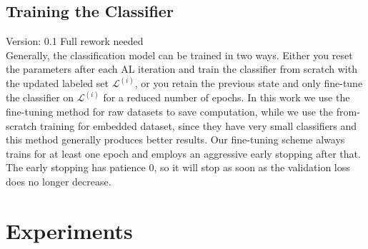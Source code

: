\documentclass[]{article}
\begin{document}
\subsection{Training the Classifier}\label{sec:training_the_classifier}
{\color{red} Version: 0.1 Full rework needed}\\
Generally, the classification model can be trained in two ways. Either you reset the parameters after each AL iteration and train the classifier from scratch with the updated labeled set $\mathcal{L}^{(i)}$, or you retain the previous state and only fine-tune the classifier on $\mathcal{L}^{(i)}$ for a reduced number of epochs.
In this work we use the fine-tuning method for raw datasets to save computation, while we use the from-scratch training for embedded dataset, since they have very small classifiers and this method generally produces better results.
Our fine-tuning scheme always trains for at least one epoch and employs an aggressive early stopping after that.
The early stopping has patience 0, so it will stop as soon as the validation loss does no longer decrease.

\section{Experiments}

\end{document}
